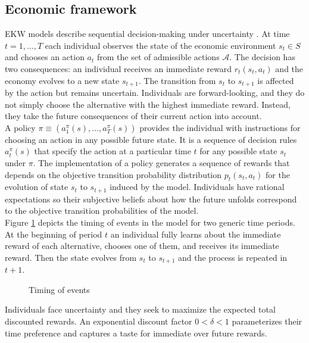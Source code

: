 \subsection{Economic framework}
EKW models describe sequential decision-making under uncertainty \citep{Gilboa.2009, Machina.2014}. At time $t = 1, \hdots, T$ each individual observes the state of the economic environment $s_t\in S$ and chooses an action $a_t$ from the set of admissible actions $\mathcal{A}$. The decision has two consequences: an individual receives an immediate reward $r_t(s_t, a_t)$ and the economy evolves to a new state $s_{t + 1}$. The transition from $s_t$ to $s_{t + 1}$ is affected by the action but remains uncertain. Individuals are forward-looking, and they do not simply choose the alternative with the highest immediate reward. Instead, they take the future consequences of their current action into account.\\

\noindent A policy $\pi \equiv(a^\pi_1(s), \hdots, a^\pi_T(s))$ provides the individual with instructions for choosing an action in any possible future state. It is a sequence of decision rules $a^\pi_t(s)$ that specify the action at a particular time $t$ for any possible state $s_t$ under $\pi$. The implementation of a policy generates a sequence of rewards that depends on the objective transition probability distribution $p_t(s_t, a_t)$ for the evolution of state $s_t$ to $s_{t + 1}$ induced by the model. Individuals have rational expectations \citep{Lucas.1972, Muth.1961} so their subjective beliefs about how the future unfolds correspond to the objective transition probabilities of the model.\\

\noindent Figure \ref{Timing} depicts the timing of events in the model for two generic time periods. At the beginning of period $t$ an individual fully learns about the immediate reward of each alternative, chooses one of them, and receives its immediate reward. Then the state evolves from $s_t$ to $s_{t + 1}$ and the process is repeated in $t + 1$.
%
\begin{figure}\caption{Timing of events}\label{Timing}\vspace{1.0cm}\centering

\end{figure}
%
\noindent Individuals face uncertainty and they seek to maximize the expected total discounted rewards. An exponential discount factor $0 < \delta < 1$ parameterizes their time preference and captures a taste for immediate over future rewards.\\

